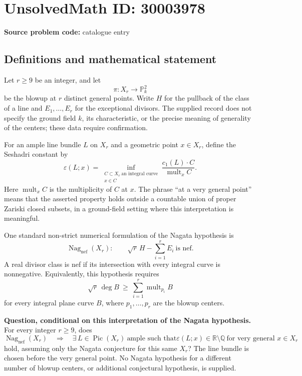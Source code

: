\documentclass[11pt]{article}
\begin{document}
\section*{UnsolvedMath ID: 30003978}
\textbf{Source problem code:} catalogue entry
\subsection{Definitions and mathematical statement}
Let \(r\geq 9\) be an integer, and let
\[
\pi:X_r\longrightarrow \mathbb P^2_k
\]
be the blowup at \(r\) distinct general points. Write \(H\) for the pullback of the class of a line and \(E_1,\ldots,E_r\) for the exceptional divisors. The supplied record does not specify the ground field \(k\), its characteristic, or the precise meaning of generality of the centers; these data require confirmation.

For an ample line bundle \(L\) on \(X_r\) and a geometric point \(x\in X_r\), define the Seshadri constant by
\[
\varepsilon(L;x)=\inf_{\substack{C\subset X_r\ \text{an integral curve}\\x\in C}}
\frac{c_1(L)\cdot C}{\operatorname{mult}_x C}.
\]
Here \(\operatorname{mult}_x C\) is the multiplicity of \(C\) at \(x\). The phrase ``at a very general point'' means that the asserted property holds outside a countable union of proper Zariski closed subsets, in a ground-field setting where this interpretation is meaningful.

One standard non-strict numerical formulation of the Nagata hypothesis is
\[
\operatorname{Nag}_{\mathrm{nef}}(X_r):\qquad
\sqrt r\,H-\sum_{i=1}^r E_i\ \text{is nef}.
\]
A real divisor class is nef if its intersection with every integral curve is nonnegative. Equivalently, this hypothesis requires
\[
\sqrt r\,\deg B\ \geq\ \sum_{i=1}^r\operatorname{mult}_{p_i}B
\]
for every integral plane curve \(B\), where \(p_1,\ldots,p_r\) are the blowup centers.

\textbf{Question, conditional on this interpretation of the Nagata hypothesis.} For every integer \(r\geq 9\), does
\[
\operatorname{Nag}_{\mathrm{nef}}(X_r)
\quad\Longrightarrow\quad
\exists\,L\in\operatorname{Pic}(X_r)\ \text{ample such that}
\varepsilon(L;x)\in\mathbb R\setminus\mathbb Q
\ \text{for very general }x\in X_r
\]
hold, assuming only the Nagata conjecture for this same \(X_r\)? The line bundle is chosen before the very general point. No Nagata hypothesis for a different number of blowup centers, or additional conjectural hypothesis, is supplied.
\end{document}
